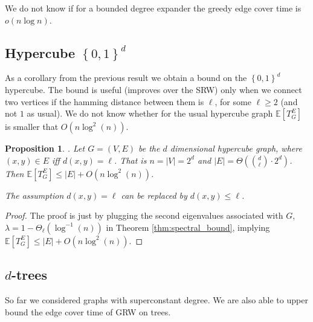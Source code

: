 \documentclass[12pt,a4paper]{article}
\newcommand{\zo}{ \left\{0,1\right\} }
\newcommand{\0}{{\bf 0}}
\newcommand{\E}{{\mathbb E}}
\newtheorem{proposition}[theorem]{Proposition}
\begin{document}
    We do not know if for a bounded degree expander the greedy edge cover time is $o(n \log n)$.

\subsection{Hypercube $\zo^d$}\label{subsec:zo^d}

    As a corollary from the previous result we obtain a bound on the $\zo^d$ hypercube.
    The bound is useful (improves over the SRW) only
    when we connect two vertices if the hamming distance between them is $\ell$, for some $\ell \geq 2$ (and not $1$ as usual).
    We do not know whether for the usual hypercube graph $\E[T^E_G]$ is smaller that $O(n \log^2(n))$.

    \begin{proposition}\label{thm:zo^d}.
        Let $G=(V,E)$ be the $d$ dimensional hypercube graph, where $(x,y) \in E$ iff $d(x,y) = \ell$.
        That is $n = |V| = 2^d$ and $|E| = \Theta( {d \choose \ell} \cdot 2^d )$.
        Then $\E[T^E_G] \leq |E| + O ( n \log^2(n) )$.

        The assumption $d(x,y) = \ell$ can be replaced by $d(x,y) \leq \ell$.
    \end{proposition}

    \begin{proof}
        The proof is just by plugging the second eigenvalues associated with $G$, $\lambda = 1 - \Theta_\ell(\log^{-1}(n))$ in Theorem \ref{thm:spectral_bound},
        implying $\E[T^E_G] \leq |E| + O ( n \log^2(n) )$.
    \end{proof}

\subsection{$d$-trees}\label{subsec:binary_tree}

    So far we considered graphs with superconstant degree.
    We are also able to upper bound the edge cover time of GRW on trees.
\end{document}
